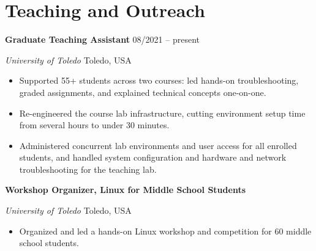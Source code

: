 \documentclass[11pt,a4paper]{article}
\newcommand{\entry}[4]{%
  \textbf{#1} \hfill #2\par
  \textit{#3} \hfill #4\par\vspace{1pt}}
\begin{document}
\section{Teaching and Outreach}
\entry{Graduate Teaching Assistant}{08/2021 -- present}
      {University of Toledo}{Toledo, USA}
\begin{itemize}
  \item Supported 55+ students across two courses:
        led hands-on troubleshooting, graded assignments, and explained technical
        concepts one-on-one.
  \item Re-engineered the course lab infrastructure, cutting environment setup time
        from several hours to under 30 minutes.
  \item Administered concurrent lab environments and user access for all enrolled
        students, and handled system configuration and hardware and network
        troubleshooting for the teaching lab.
\end{itemize}
\vspace{3pt}
\entry{Workshop Organizer, Linux for Middle School Students}{}
      {University of Toledo}{Toledo, USA}
\begin{itemize}
  \item Organized and led a hands-on Linux workshop and competition for 60 middle
        school students.
\end{itemize}

\end{document}
